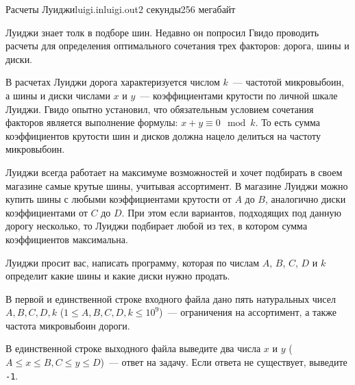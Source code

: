\begin{problem}{Расчеты Луиджи}{luigi.in}{luigi.out}{2 секунды}{256 мегабайт}
                                                                    

Луиджи знает толк в подборе шин. Недавно он попросил Гвидо проводить расчеты для определения оптимального сочетания трех факторов: дорога, шины и диски.

В расчетах Луиджи дорога характеризуется числом $k$~--- частотой микровыбоин, а шины и диски числами $x$ и $y$~--- коэффициентами крутости
по личной шкале Луиджи. Гвидо опытно установил, что обязательным условием сочетания факторов является выполнение формулы:
$x + y \equiv 0 \mod k$. То есть сумма коэффициентов крутости шин и дисков должна нацело делиться на частоту микровыбоин.

Луиджи всегда работает на максимуме возможностей и хочет подбирать в своем магазине самые крутые шины, учитывая ассортимент.
В магазине Луиджи можно купить шины с любыми коэффициентами крутости от $A$ до $B$, аналогично диски коэффициентами от $C$ до $D$.
При этом если вариантов, подходящих под данную дорогу несколько, то Луиджи подбирает любой из тех, в котором сумма коэффициентов максимальна.


Луиджи просит вас, написать программу, которая по числам $A$, $B$, $C$, $D$ и $k$ определит какие шины и какие диски нужно продать.    

\InputFile
В первой и единственной строке входного файла дано пять натуральных чисел $A, B, C, D, k$ ($1 \le A, B, C, D, k \le 10^9$)~--- ограничения
на ассортимент, а также частота микровыбоин дороги.

\OutputFile
В единственной строке выходного файла выведите два числа $x$ и $y$ ($A \le x \le B, C \le y \le D$)~--- ответ на задачу. 
Если ответа не существует, выведите \texttt{-1}.

\Example
\begin{example}%
%
%
%
\end{example}

\end{problem}